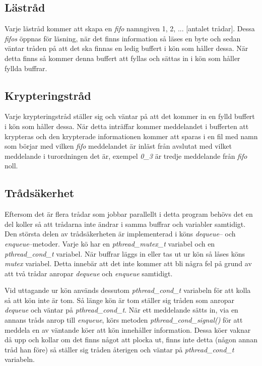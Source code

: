 \documentclass[a4paper, 12pt]{article}
\begin{document}
\subsection{Lästråd}\label{sec:lastrad}
Varje lästråd kommer att skapa en \textit{fifo} namngiven 1, 2, ...
[antalet trådar]. Dessa \textit{fifos} öppnas för läsning, när det
finns information så läses en byte och sedan väntar tråden på att det
ska finnas en ledig buffert i kön som håller dessa. När detta finns så
kommer denna buffert att fyllas och sättas in i kön som håller fyllda
buffrar.

\subsection{Krypteringstråd}\label{sec:krypteringstrad}
Varje krypteringstråd ställer sig och väntar på att det kommer in en
fylld buffert i kön som håller dessa. När detta inträffar kommer
meddelandet i bufferten att krypteras och den krypterade informationen
kommer att sparas i en fil med namn som börjar med vilken
\textit{fifo} meddelandet är inläst från avslutat med vilket
meddelande i turordningen det är, exempel \textit{0\_3} är tredje
meddelande från \textit{fifo} noll.

\subsection{Trådsäkerhet}\label{sec:tradsakerhet}
Eftersom det är flera trådar som jobbar parallellt i detta program
behövs det en del koller så att trådarna inte ändrar i samma buffrar
och variabler samtidigt. Den största delen av trådsäkerheten är
implementerad i köns \textit{dequeue}– och \textit{enqueue}–metoder.
Varje kö har en \textit{pthread\_mutex\_t} variabel och en
\textit{pthread\_cond\_t} variabel. När buffrar läggs in eller tas ut ur
kön så låses köns \textit{mutex} variabel. Detta innebär att det inte
kommer att bli några fel på grund av att två trådar anropar
\textit{dequeue} och \textit{enqueue} samtidigt.

Vid uttagande ur kön används dessutom \textit{pthread\_cond\_t}
variabeln för att kolla så att kön inte är tom. Så länge kön är tom
ställer sig tråden som anropar \textit{dequeue} och väntar på
\textit{pthread\_cond\_t}. När ett meddelande sätts in, via en annans
tråds anrop till \textit{enqueue}, körs metoden
\textit{pthread\_cond\_signal()} för att meddela en av väntande köer
att kön innehåller information. Dessa köer vaknar då upp och kollar om
det finns något att plocka ut, finns inte detta (någon annan tråd han
före) så ställer sig tråden återigen och väntar på
\textit{pthread\_cond\_t} variabeln.
\end{document}
